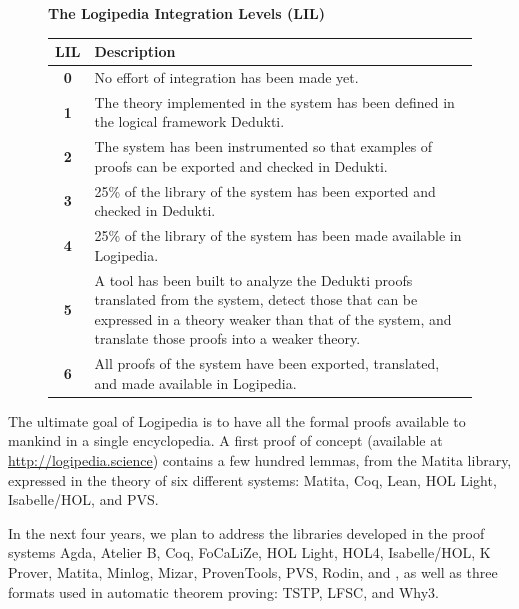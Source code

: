 \begin{figure}[ht]
\begin{shaded}
\begin{center}
{\bf \Large The Logipedia Integration Levels (LIL)\label{lil}}
\end{center}

\begin{longtable}{|c|p{}|}
\hline
{\bf LIL} & {\bf Description}\\
\hline
{\bf 0} & No effort of integration has been made yet.\\
\hline
{\bf 1} & The theory implemented in the system has been defined in
the logical framework Dedukti.\\
\hline
{\bf 2} & The system has been instrumented so that examples of proofs
can be exported and checked in Dedukti.\\
\hline
{\bf 3} & 25\% of the library of the system has been
exported and checked in Dedukti.\\
\hline
{\bf 4} & 25\% of the library of the system has
been made available in Logipedia.\\
\hline
{\bf 5} & A tool has been built to analyze the Dedukti proofs
translated from the system, detect those that can be expressed in a theory
weaker than that of the system, and translate those proofs into a
weaker theory.\\
\hline
{\bf 6} & All proofs of the system have been exported, translated,
and made available in Logipedia.\\
\hline
\end{longtable}
\end{shaded}
\end{figure}

The ultimate goal of Logipedia is to have all the formal proofs
available to mankind in a single encyclopedia.  A first proof of
concept (available at \url{http://logipedia.science}) contains a few hundred
lemmas, from the Matita library, expressed in the theory of six
different systems: Matita, Coq, Lean, HOL Light, Isabelle/HOL, and
PVS.

In the next four years, we plan to address
the libraries developed in the proof systems Agda, Atelier B, Coq, FoCaLiZe, HOL Light, HOL4,
Isabelle/HOL, K Prover, Matita, Minlog, Mizar, ProvenTools, PVS,
Rodin, and \tlaplus, as well as three formats used in automatic
theorem proving: TSTP, LFSC, and Why3. 

